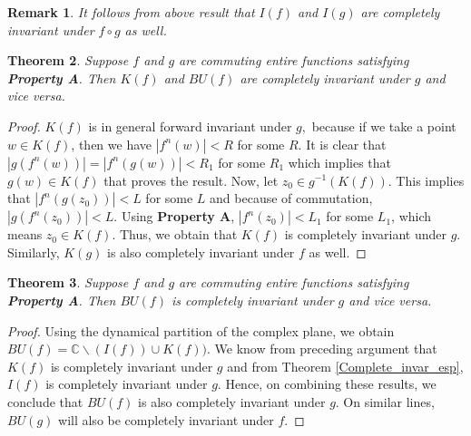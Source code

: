 \documentclass[a4paper,12pt]{amsart}
\newcommand{\ity}{\infty}
\numberwithin{equation}{section}
\newtheorem{theorem}{Theorem}[section]
\newtheorem{lemma}[theorem]{Lemma}
\newtheorem{remark}[theorem]{Remark}
\begin{document}
\begin{remark}
It follows from above result that   $I(f)$ and $I(g)$ are completely invariant under  $f \circ g$ as well.
\end{remark}
%

\begin{theorem} \label{K_BU_no_asymp} 
Suppose $f$ and $g$ are commuting entire functions satisfying \textbf{Property A}. Then $K(f)$ and   $BU(f)$ are completely invariant under $g$ and vice versa.
\end{theorem}
\begin{proof}
$K(f)$ is in general forward invariant under $g,$ because if we take a point $w\in K(f)$, then we have $|f^{n}(w)|< R$ for some $R.$ It is clear that $|g(f ^{n}(w))|=|f ^{n}(g(w))|< R_1$ for some $R_1$  which implies that $g(w)\in K(f)$ that proves the result. Now, let $z_0 \in g^{-1}(K(f)).$ This implies that  $|f^{n}(g(z_0))| < L$ for some $L$ and because of commutation, $|g(f^{n}(z_0))|< L.$ Using  \textbf{Property A},  $|f^{n}(z_0)|<L_1$ for some $L_1$, which means $z_0 \in K(f)$. Thus, we obtain that $K(f)$ is completely invariant under $g$. Similarly, $K(g)$ is also completely invariant under $f$ as well.
\end{proof}

\begin{theorem} \label{K_BU_no_asymp1} 
Suppose $f$ and $g$ are commuting entire functions satisfying \textbf{Property A}. Then  $BU(f)$ is completely invariant under $g$ and vice versa.
\end{theorem}
\begin{proof}
Using the dynamical partition of the complex plane, we obtain $BU(f)= \mathbb{C} \backslash (I(f))\cup K(f)).$ We know from preceding argument that $K(f)$ is completely invariant under $g$ and from Theorem \ref{Complete_invar_esp}, $I(f)$ is completely invariant under $g.$ Hence, on combining these results, we  conclude that $BU(f)$ is also completely invariant under $g$. On similar lines, $BU(g)$ will  also be completely invariant under $f$. 
\end{proof}
\end{document}
